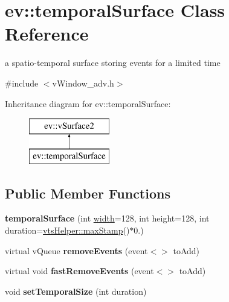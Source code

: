 \hypertarget{classev_1_1temporalSurface}{}\section{ev\+:\+:temporal\+Surface Class Reference}
\label{classev_1_1temporalSurface}


a spatio-\/temporal surface storing events for a limited time  




{\ttfamily \#include $<$v\+Window\+\_\+adv.\+h$>$}

Inheritance diagram for ev\+:\+:temporal\+Surface\+:\begin{figure}[H]
\begin{center}
\leavevmode
\includegraphics[height=2.000000cm]{classev_1_1temporalSurface}
\end{center}
\end{figure}
\subsection*{Public Member Functions}
\begin{DoxyCompactItemize}
\item 
{\bfseries temporal\+Surface} (int \hyperlink{classev_1_1vSurface2_a1aa8027816352a15d5b9bf1f26f48e76}{width}=128, int height=128, int duration=\hyperlink{classev_1_1vtsHelper_aa7f1c13eb051773e9413b52bb52caad0}{vts\+Helper\+::max\+Stamp}()$\ast$0.)\hypertarget{classev_1_1temporalSurface_ad2f8ebcbe5ff5825d0473cd05f00389e}{}\label{classev_1_1temporalSurface_ad2f8ebcbe5ff5825d0473cd05f00389e}

\item 
virtual v\+Queue {\bfseries remove\+Events} (event$<$$>$ to\+Add)\hypertarget{classev_1_1temporalSurface_a358c548e6727aa89d908e61ad948b1ca}{}\label{classev_1_1temporalSurface_a358c548e6727aa89d908e61ad948b1ca}

\item 
virtual void {\bfseries fast\+Remove\+Events} (event$<$$>$ to\+Add)\hypertarget{classev_1_1temporalSurface_a78a9bb93145915a90a5105bab812bb65}{}\label{classev_1_1temporalSurface_a78a9bb93145915a90a5105bab812bb65}

\item 
void {\bfseries set\+Temporal\+Size} (int duration)\hypertarget{classev_1_1temporalSurface_a35d4b67c18393961fa833d330a040e80}{}\label{classev_1_1temporalSurface_a35d4b67c18393961fa833d330a040e80}

\end{DoxyCompactItemize}
